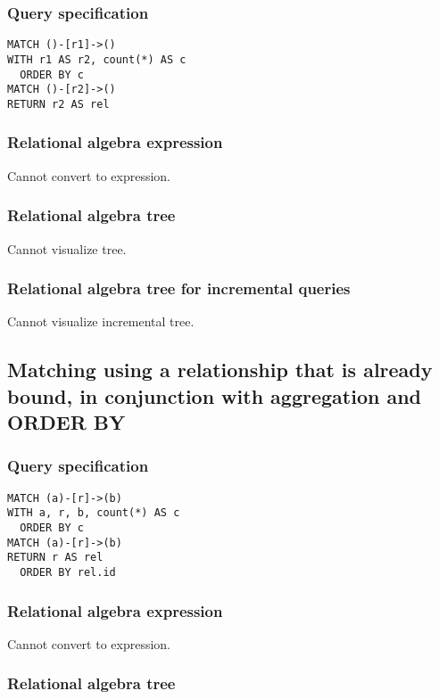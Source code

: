 \subsubsection*{Query specification}

\begin{lstlisting}
MATCH ()-[r1]->()
WITH r1 AS r2, count(*) AS c
  ORDER BY c
MATCH ()-[r2]->()
RETURN r2 AS rel
\end{lstlisting}

\subsubsection*{Relational algebra expression}

Cannot convert to expression.

\subsubsection*{Relational algebra tree}

Cannot visualize tree.

\subsubsection*{Relational algebra tree for incremental queries}

Cannot visualize incremental tree.

\subsection{Matching using a relationship that is already bound, in conjunction with aggregation and ORDER BY}

\subsubsection*{Query specification}

\begin{lstlisting}
MATCH (a)-[r]->(b)
WITH a, r, b, count(*) AS c
  ORDER BY c
MATCH (a)-[r]->(b)
RETURN r AS rel
  ORDER BY rel.id
\end{lstlisting}

\subsubsection*{Relational algebra expression}

Cannot convert to expression.

\subsubsection*{Relational algebra tree}

